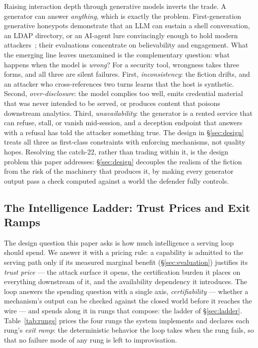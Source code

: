 Raising interaction depth through generative models inverts the trade.
A generator can answer \emph{anything}, which is exactly the problem.
First-generation generative honeypots demonstrate that an LLM can sustain
a shell conversation, an LDAP directory, or an AI-agent lure convincingly
enough to hold modern attackers~\cite{valeros2024,reworr2024,jimenez2025};
their evaluations concentrate on believability and engagement. What the
emerging line leaves unexamined is the complementary question: what
happens when the model is \emph{wrong}? For a security tool, wrongness
takes three forms, and all three are silent failures. First,
\emph{inconsistency}: the fiction drifts, and an attacker who
cross-references two turns learns that the host is synthetic. Second,
\emph{over-disclosure}: the model complies too well, emits credential
material that was never intended to be served, or produces content that
poisons downstream analytics. Third, \emph{unavailability}: the generator
is a rented service that can refuse, stall, or vanish mid-session, and a
deception endpoint that answers with a refusal has told the attacker
something true. The design in \S\ref{sec:design} treats all three as
first-class constraints with enforcing mechanisms, not quality hopes.
Resolving the catch-22, rather than trading within it, is the design
problem this paper addresses: \S\ref{sec:design} decouples the realism
of the fiction from the risk of the machinery that produces it, by
making every generator output pass a check computed against a world the
defender fully controls.

\subsection{The Intelligence Ladder: Trust Prices and Exit Ramps}
\label{sec:rungs}

The design question this paper asks is how much intelligence a serving
loop should spend. We answer it with a pricing rule: a capability is
admitted to the serving path only if its measured marginal benefit
(\S\ref{sec:evaluation}) justifies its \emph{trust price} --- the
attack surface it opens, the certification burden it places on
everything downstream of it, and the availability dependency it
introduces. The loop answers the spending question with a single axis,
\emph{certifiability} --- whether a mechanism's output can be checked
against the closed world before it reaches the wire --- and spends
along it in rungs that compose: the ladder of \S\ref{sec:ladder}.
Table~\ref{tab:rungs} prices the four rungs the system implements and
declares each rung's \emph{exit ramp}: the deterministic behavior the
loop takes when the rung fails, so that no failure mode of any rung is
left to improvisation.

